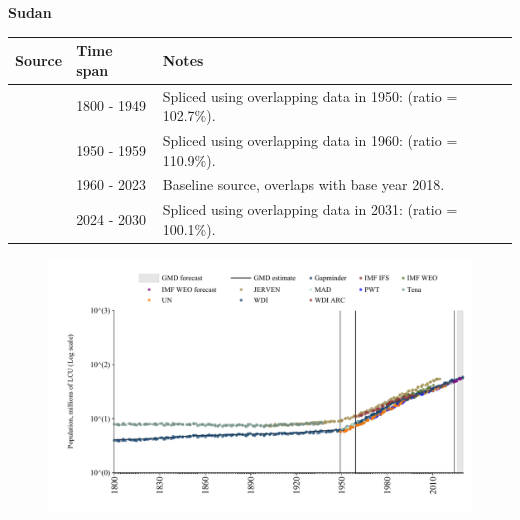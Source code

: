 \documentclass[12pt,a4paper,landscape]{article}
\begin{document}
\begin{adjustbox}{max totalsize={\paperwidth}{\paperheight},center}
\begin{minipage}[t][\textheight][t]{\textwidth}
\vspace*{0.5cm}
{}
\begin{center}
{\Large\bfseries Sudan}
\end{center}
\vspace{0.5cm}
\begin{table}[H]
\centering
\small
\begin{tabular}{|l|l|l|}
\hline
\textbf{Source} & \textbf{Time span} & \textbf{Notes} \\
\hline
\rowcolor{white}\cite{Gapminder}& 1800 - 1949 &Spliced using overlapping data in 1950: (ratio = 102.7\%).\\
\rowcolor{lightgray}\cite{IMF_IFS}& 1950 - 1959 &Spliced using overlapping data in 1960: (ratio = 110.9\%).\\
\rowcolor{white}\cite{WDI}& 1960 - 2023 &Baseline source, overlaps with base year 2018.\\
\rowcolor{lightgray}\cite{Gapminder}& 2024 - 2030 &Spliced using overlapping data in 2031: (ratio = 100.1\%).\\
\hline
\end{tabular}
\end{table}
\begin{figure}[H]
\centering
\includegraphics[width=\textwidth,height=0.6\textheight,keepaspectratio]{graphs/SDN_pop.pdf}
\end{figure}
\end{minipage}
\end{adjustbox}
\end{document}
